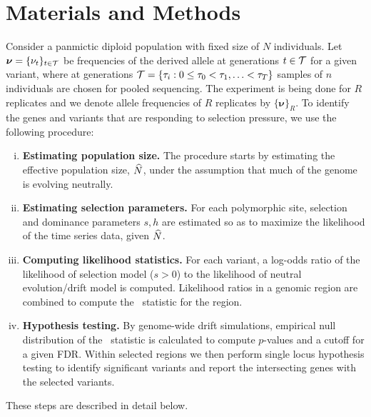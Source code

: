 \section{Materials and Methods}
\label{sec:method}
Consider a panmictic diploid population with fixed size of $N$ individuals. 
Let
$\bm{ \nu} =\{\nu_t\}_{t\in{\cal T}}$ be frequencies of the derived allele 
at generations
$t\in{\cal T}$ for a given variant, 
where at generations ${\cal T}= \{\tau_i: 0\le
\tau_0<\tau_1,\ldots< \tau_T\}$ samples 
of $n$ individuals are chosen for pooled
sequencing. 
The experiment is being done for $R$ replicates and we denote allele 
frequencies of  $R$ replicates by $\{\bm{\nu}\}_R$.
To identify the genes and variants
that are responding to selection pressure, we use the following
procedure:
\begin{enumerate}[(i)]
\item {\bf Estimating population size.} The procedure starts by
  estimating the effective population size, $\widehat{N}$, under the
  assumption that much of the genome is evolving neutrally.
\item {\bf Estimating selection parameters.} For each polymorphic
  site, selection and dominance parameters $s,h$ are estimated so
  as to maximize the likelihood of the time series data, given $\widehat{N}$.
\item {\bf Computing likelihood statistics.} For each variant, a
  log-odds ratio of the likelihood of selection model ($s>0$) to the
  likelihood of neutral evolution/drift model is computed. Likelihood
  ratios in a genomic region are combined to compute the \comale\
  statistic for the region.
\item {\bf Hypothesis testing.} 
By genome-wide drift simulations, empirical 
null distribution of the \comale\ statistic is 
calculated to compute $p$-values and a cutoff for a given FDR.
Within selected regions we then perform single locus hypothesis testing to 
identify significant variants and report the intersecting genes with the selected 
variants.
\end{enumerate}
These steps are described in detail below.
